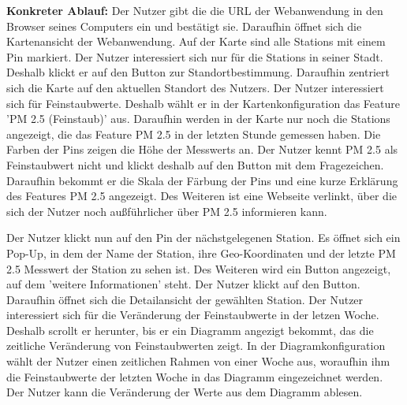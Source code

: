 \textbf{Konkreter Ablauf:} Der Nutzer gibt die die URL der \gls{Webanwendung} in den Browser seines Computers ein und bestätigt sie. 
Daraufhin öffnet sich die \gls{Kartenansicht} der \gls{Webanwendung}. Auf der Karte sind alle \glspl{Station} mit einem \gls{Pin} 
markiert. Der Nutzer interessiert sich nur für die \glspl{Station} in seiner Stadt. Deshalb klickt er auf den Button zur 
Standortbestimmung. Daraufhin zentriert sich die Karte auf den aktuellen Standort des Nutzers.
Der Nutzer interessiert sich für Feinstaubwerte. Deshalb wählt er in der Kartenkonfiguration das \gls{Feature} 
'PM 2.5 (Feinstaub)' aus. Daraufhin werden in der Karte nur noch die \glspl{Station} angezeigt, die das \gls{Feature} PM 2.5 in 
der letzten Stunde gemessen haben. Die Farben der \glspl{Pin} zeigen die Höhe der \glspl{Messwert} an.
Der Nutzer kennt PM 2.5 als Feinstaubwert nicht und klickt deshalb auf den Button mit dem Fragezeichen. Daraufhin bekommt er die 
Skala der Färbung der \glspl{Pin} und eine kurze Erklärung des \glspl{Feature} PM 2.5 angezeigt. Des Weiteren ist eine Webseite 
verlinkt, über die sich der Nutzer noch außführlicher über PM 2.5 informieren kann.

Der Nutzer klickt nun auf den Pin der nächstgelegenen \gls{Station}. Es öffnet sich ein \gls{Pop-Up}, in dem der Name 
der \gls{Station}, ihre Geo-Koordinaten und der letzte PM 2.5 \gls{Messwert} der \gls{Station} zu sehen ist. Des Weiteren wird 
ein Button angezeigt, auf dem 'weitere Informationen' steht. Der Nutzer klickt auf den Button. Daraufhin öffnet sich die 
\gls{Detailansicht} der gewählten \gls{Station}. Der Nutzer interessiert sich für die Veränderung der Feinstaubwerte in der 
letzen Woche. Deshalb scrollt er herunter, bis er ein Diagramm angezigt bekommt, das die zeitliche Veränderung von Feinstaubwerten 
zeigt. In der Diagramkonfiguration wählt der Nutzer einen zeitlichen Rahmen von einer Woche aus, woraufhin ihm die Feinstaubwerte 
der letzten Woche in das Diagramm eingezeichnet werden. Der Nutzer kann die Veränderung der Werte aus dem Diagramm ablesen.